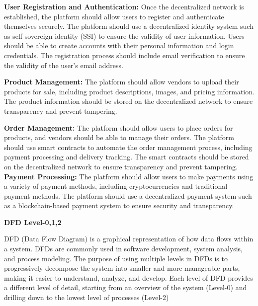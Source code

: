 \documentclass[a4paper,11pt]{article}
\begin{document}
\begin{center}
\textbf{User Registration and Authentication:}
Once the decentralized network is established, the platform should allow users to register and authenticate themselves securely. The platform should use a decentralized identity system such as self-sovereign identity (SSI) to ensure the validity of user information. Users should be able to create accounts with their personal information and login credentials. The registration process should include email verification to ensure the validity of the user's email address.

\textbf{Product Management:}
The platform should allow vendors to upload their products for sale, including product descriptions, images, and pricing information. The product information should be stored on the decentralized network to ensure transparency and prevent tampering.

\textbf{Order Management:}
The platform should allow users to place orders for products, and vendors should be able to manage their orders. The platform should use smart contracts to automate the order management process, including payment processing and delivery tracking. The smart contracts should be stored on the decentralized network to ensure transparency and prevent tampering.\\


\textbf{Payment Processing:}
The platform should allow users to make payments using a variety of payment methods, including cryptocurrencies and traditional payment methods. The platform should use a decentralized payment system such as a blockchain-based payment system to ensure security and transparency.


\vspace{1cm}

\textbf{DFD Level-0,1,2}
\vspace{0.5cm}

 
 DFD (Data Flow Diagram) is a graphical representation of how data flows within a system. DFDs are commonly used in software development, system analysis, and process modeling. The purpose of using multiple levels in DFDs is to progressively decompose the system into smaller and more manageable parts, making it easier to understand, analyze, and develop. Each level of DFD provides a different level of detail, starting from an overview of the system (Level-0) and drilling down to the lowest level of processes (Level-2) \\



\end{center}
\end{document}
